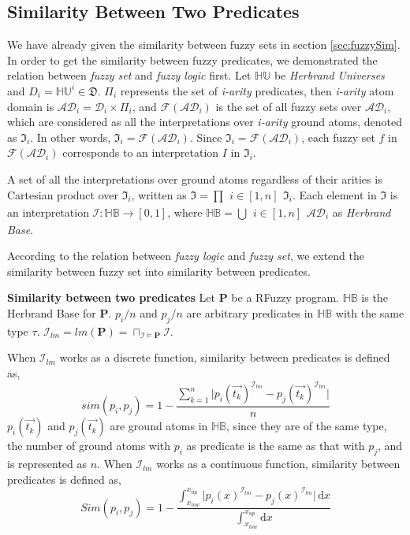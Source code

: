 \subsection{Similarity Between Two Predicates}
\label{sec:predicateSim}
We have already given the similarity between fuzzy sets in section \ref{sec:fuzzySim}. In order to get the similarity between fuzzy predicates, we demonstrated the relation between \textit{fuzzy set} and \textit{fuzzy logic} first. 
Let $\mathbb{HU}$ be \textit{Herbrand Universes} and $D_i = \mathbb{HU}^{i} \in \mathfrak{D}$. $\Pi_i$ represents the set of \textit{i-arity} predicates, then \textit{i-arity} atom domain is $\mathcal{AD}_i = \mathcal{D}_i \times \Pi_i$, and $\mathcal{F}(\mathcal{AD}_i)$ is the set of all fuzzy sets over $\mathcal{AD}_i$, which are considered as all the interpretations over \textit{i-arity} ground atoms, denoted as $\mathfrak{I}_i$.
In other words, $\mathfrak{I}_i=\mathcal{F}(\mathcal{AD}_i)$. Since $\mathfrak{I}_i=\mathcal{F}(\mathcal{AD}_i)$, each fuzzy set $f$ in $\mathcal{F}(\mathcal{AD}_i)$ corresponds to an interpretation $I$ in $\mathfrak{I}_i$. 

A set of all the interpretations over ground atoms regardless of their arities is Cartesian product over $\mathfrak{I}_i$, written as $\mathfrak{I}=\prod{\substack{i \in [1,n]}}\mathfrak{I}_i$. Each element in $\mathfrak{I}$ is an interpretation $\mathcal{I} : \mathbb{HB} \rightarrow [0,1]$, where $\mathbb{HB}=\bigcup{\substack{i \in [1,n]}}\mathcal{AD}_i$ as \textit{Herbrand Base}. 

According to the relation between \textit{fuzzy logic} and \textit{fuzzy set}, we extend the similarity between fuzzy set into similarity between predicates.

\begin{defin}\textbf{Similarity between two predicates}
Let \textbf{P} be a RFuzzy program. $\mathbb{HB}$ is the Herbrand Base for \textbf{P}. $p_i/n$ and $p_j/n$ are arbitrary predicates in $\mathbb{HB}$ with the same type $\tau$. $\mathcal{I}_{lm}=lm(\textbf{P})=\sqcap_{\mathcal{I}\models\textbf{P}}\mathcal{I}$. 

When $\mathcal{I}_{lm}$ works as a discrete function, similarity between predicates is defined as,
\begin{equation}
sim(p_i,p_j)=1-\frac{\sum_{k=1}^{n} \rvert p_i(\vec{t_k})^{\mathcal{I}_{lm}}-p_j(\vec{t_k})^{\mathcal{I}_{lm}} \lvert}{n}
\end{equation}
$p_i(\vec{t_k})$ and $p_j(\vec{t_k})$ are ground atoms in $\mathbb{HB}$, since they are of the same type, the number of ground atoms with $p_i$ as predicate is the same as that with $p_j$, and is represented as $n$.
When $\mathcal{I}_{lm}$ works as a continuous function, similarity between predicates is defined as,
\begin{equation}
Sim(p_i,p_j) =1- \frac{\int_{x_{low}}^{x_{up}} \rvert p_i(x)^{\mathcal{I}_{lm}}-p_j(x)^{\mathcal{I}_{lm}} \lvert\, \mathrm{d}x}{\int_{x_{low}}^{x_{up}}\mathrm{d}x}
\end{equation}

\end{defin} 

